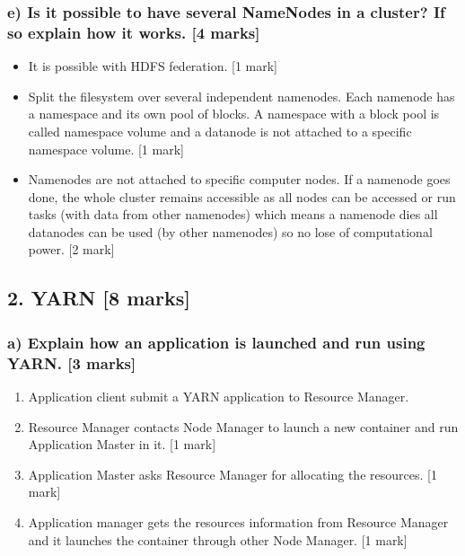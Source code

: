 \documentclass[11pt,a4paper]{article}
\begin{document}
\subsubsection*{e) Is it possible to have several NameNodes in a cluster? If so explain how it works. [4 marks]}

\begin{itemize}
\item It is possible with HDFS federation. [1 mark] 
\item Split the filesystem over several independent namenodes. Each namenode has a namespace and its own pool of blocks. A namespace with a block pool is called namespace volume and a datanode is not attached to a specific namespace volume. [1 mark]
\item Namenodes are not attached to specific computer nodes. If a namenode goes done, the whole cluster remains accessible as all nodes can be accessed or run tasks (with data from other namenodes) which means a namenode dies all datanodes can be used (by other namenodes) so no lose of computational power. [2 mark]
\end{itemize}

\subsection*{2. YARN [8 marks]}
\subsubsection*{a) Explain how an application is launched and run using YARN. [3 marks]}
\begin{enumerate}
	\item Application client submit a YARN application to Resource Manager.
	\item Resource Manager contacts Node Manager to launch a new container and run Application Master in it. [1 mark]
	\item Application Master asks Resource Manager for allocating the resources. [1 mark]
	\item Application manager gets the resources information from Resource Manager and it launches the container through other Node Manager. [1 mark]
\end{enumerate}
\end{document}
